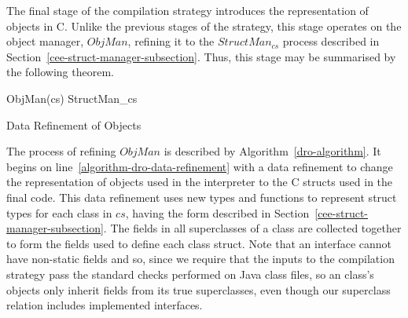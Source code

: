 The final stage of the compilation strategy introduces the
representation of objects in C.
Unlike the previous stages of the strategy, this stage operates on the
object manager, $ObjMan$, refining it to the $StructMan_{cs}$ process
described in Section~\ref{cee-struct-manager-subsection}.
Thus, this stage may be summarised by the following theorem.
\begin{thm}\label{dro-thm}
  \begin{circus}
    ObjMan(cs) \circrefines StructMan_{cs}
  \end{circus}
\end{thm}

\begin{algorithm}[b]
  \begin{algorithmic}[1]
    \State {}
    \label{algorithm-dro-data-refinement}
    \State {}
    \label{algorithm-dro-refine-NewObject}
    \State {}
    \State {}
    \State {}
    \State {}
    \label{algorithm-dro-refine-PutStatic}
    \State {}
    \label{algorithm-dro-cs-elimination}
  \end{algorithmic}
  \caption{Data Refinement of Objects}
  \label{dro-algorithm}
\end{algorithm}

The process of refining $ObjMan$ is described by
Algorithm~\ref{dro-algorithm}. 
It begins on line~\ref{algorithm-dro-data-refinement} with a data
refinement to change the representation of objects used in the
interpreter to the C structs used in the final code.
This data refinement uses new types and functions to represent struct
types for each class in $cs$, having the form described in
Section~\ref{cee-struct-manager-subsection}.
The fields in all superclasses of a class are collected together to
form the fields used to define each class struct.
Note that an interface cannot have non-static fields and so, since we
require that the inputs to the compilation strategy pass the standard
checks performed on Java class files, so an class's objects only
inherit fields from its true superclasses, even though our superclass
relation includes implemented interfaces.


